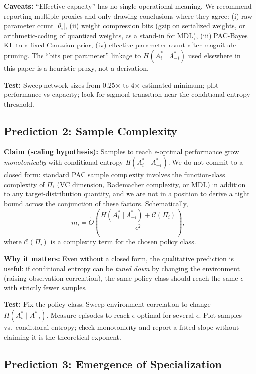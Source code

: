 \documentclass[10pt, letterpaper]{article}
\begin{document}
\textbf{Caveats:} ``Effective capacity'' has no single operational meaning. We recommend reporting multiple proxies and only drawing conclusions where they agree: (i) raw parameter count $|\theta_i|$, (ii) weight compression bits (gzip on serialized weights, or arithmetic-coding of quantized weights, as a stand-in for MDL), (iii) PAC-Bayes KL to a fixed Gaussian prior, (iv) effective-parameter count after magnitude pruning. The ``bits per parameter'' linkage to $H(A_i^* \mid A_{-i}^*)$ used elsewhere in this paper is a heuristic proxy, not a derivation.

\textbf{Test:} Sweep network sizes from 0.25$\times$ to 4$\times$ estimated minimum; plot performance vs capacity; look for sigmoid transition near the conditional entropy threshold.

\subsection{Prediction 2: Sample Complexity}
\label{pred:sample-complexity}

\textbf{Claim (scaling hypothesis):} Samples to reach $\epsilon$-optimal performance grow \emph{monotonically} with conditional entropy $H(A_i^* \mid A_{-i}^*)$. We do not commit to a closed form: standard PAC sample complexity involves the function-class complexity of $\Pi_i$ (VC dimension, Rademacher complexity, or MDL) in addition to any target-distribution quantity, and we are not in a position to derive a tight bound across the conjunction of these factors. Schematically,
\[m_i = \tilde{O}\!\left(\frac{H(A_i^* \mid A_{-i}^*) + \mathcal{C}(\Pi_i)}{\epsilon^2}\right),\]
where $\mathcal{C}(\Pi_i)$ is a complexity term for the chosen policy class.

\textbf{Why it matters:} Even without a closed form, the qualitative prediction is useful: if conditional entropy can be \emph{tuned down} by changing the environment (raising observation correlation), the same policy class should reach the same $\epsilon$ with strictly fewer samples.

\textbf{Test:} Fix the policy class. Sweep environment correlation to change $H(A_i^* \mid A_{-i}^*)$. Measure episodes to reach $\epsilon$-optimal for several $\epsilon$. Plot samples vs.\ conditional entropy; check monotonicity and report a fitted slope without claiming it is the theoretical exponent.

\subsection{Prediction 3: Emergence of Specialization}
\label{pred:specialization}
\end{document}
